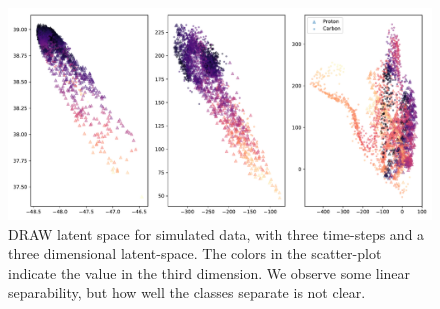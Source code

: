 \begin{figure}
	\centering
	\includegraphics[width=\textwidth, width=11cm]{latent.pdf}
	\caption[DRAW latent space for simulated data]{DRAW latent space for simulated data, with three time-steps and a three dimensional latent-space. The colors in the scatter-plot indicate the value in the third dimension. We observe some linear separability, but how well the classes separate is not clear.}
	\label{fig:draw_latent_demo}
\end{figure}



